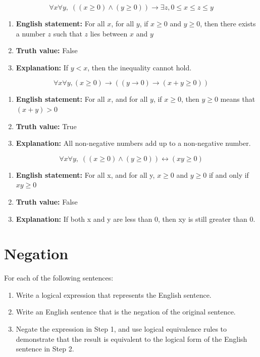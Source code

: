 \documentclass[]{article}
\begin{document}
\begin{question}{1.8}
\[
\forall x\forall y,\; ((x \ge 0) \land (y \ge 0)) \rightarrow \exists z, 0 \le x \le z \le y
\]
\end{question}
\begin{enumerate}[label=(\alph*)]
    \item \textbf{English statement:} For all $x$, for all $y$, if $x \ge 0$ and $y \ge 0$, then there exists a number $z$ such that $z$ lies between $x$ and $y$
    \item \textbf{Truth value:} False
    \item \textbf{Explanation:} If $y < x$, then the inequality cannot hold.
\end{enumerate}

\begin{question}{1.9}
\[
\forall x\forall y, (x \ge 0) \rightarrow ((y \rightarrow 0) \rightarrow ( x + y \ge 0))
\]
\end{question}
\begin{enumerate}[label=(\alph*)]
    \item \textbf{English statement:} For all $x$, and for all $y$, if $x \ge 0$, then $y \ge 0$ means that $(x + y) > 0$ 
    \item \textbf{Truth value:} True
    \item \textbf{Explanation:} All non-negative numbers add up to a non-negative number.
\end{enumerate}

\begin{question}{1.10}
\[
\forall x\forall y,\; ((x \ge 0) \land (y \ge 0)) \leftrightarrow (xy \ge 0)
\]
\end{question}
\begin{enumerate}[label=(\alph*)]
    \item \textbf{English statement:} For all x, and for all y, $x \ge 0$ and $y \ge 0$ if and only if $xy \ge 0$
    \item \textbf{Truth value:} False
    \item \textbf{Explanation:} If both x and y are less than 0, then xy is still greater than 0.
\end{enumerate}
\section{Negation}
For each of the following sentences:
\begin{enumerate}[label=(\alph*)]
  \item Write a logical expression that represents the English sentence.
  \item Write an English sentence that is the negation of the original sentence.
  \item Negate the expression in Step 1, and use logical equivalence rules to
  demonstrate that the result is equivalent to the logical form of the English sentence in Step 2.
\end{enumerate}
\end{document}
